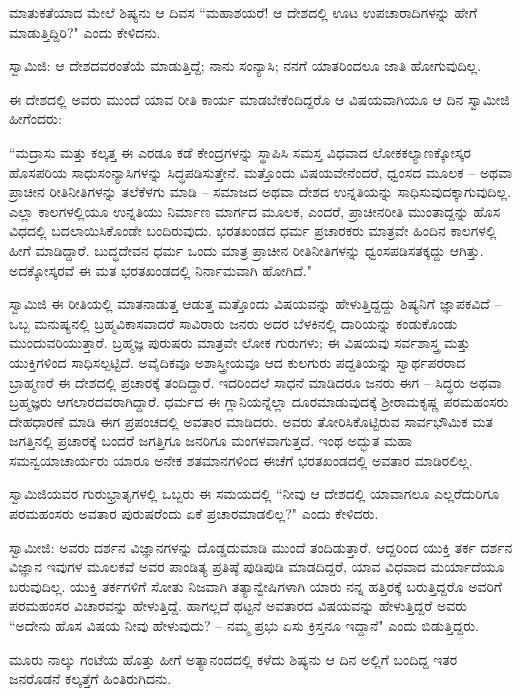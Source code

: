 ಮಾತುಕತೆಯಾದ ಮೇಲೆ ಶಿಷ್ಯನು ಆ ದಿವಸ “ಮಹಾಶಯರೆ! ಆ ದೇಶದಲ್ಲಿ ಊಟ ಉಪಚಾರಾದಿಗಳನ್ನು ಹೇಗೆ ಮಾಡುತ್ತಿದ್ದಿರಿ?" ಎಂದು ಕೇಳಿದನು.

ಸ್ವಾಮಿಜಿ: ಆ ದೇಶದವರಂತೆಯೆ ಮಾಡುತ್ತಿದ್ದೆ; ನಾನು ಸಂನ್ಯಾಸಿ; ನನಗೆ ಯಾತರಿಂದಲೂ ಜಾತಿ ಹೋಗುವುದಿಲ್ಲ.

ಈ ದೇಶದಲ್ಲಿ ಅವರು ಮುಂದೆ ಯಾವ ರೀತಿ ಕಾರ್ಯ ಮಾಡಬೇಕೆಂದಿದ್ದರೊ ಆ ವಿಷಯವಾಗಿಯೂ ಆ ದಿನ ಸ್ವಾಮೀಜಿ ಹೀಗೆಂದರು:

“ಮದ್ರಾಸು ಮತ್ತು ಕಲ್ಕತ್ತ ಈ ಎರಡೂ ಕಡೆ ಕೇಂದ್ರಗಳನ್ನು ಸ್ಥಾಪಿಸಿ ಸಮಸ್ತ ವಿಧವಾದ ಲೋಕಕಲ್ಯಾಣಕ್ಕೋಸ್ಕರ ಹೊಸಪರಿಯ ಸಾಧುಸಂನ್ಯಾಸಿಗಳನ್ನು ಸಿದ್ಧಪಡಿಸುತ್ತೇನೆ. ಮತ್ತೊಂದು ವಿಷಯವೇನೆಂದರೆ, ಧ್ವಂಸದ ಮೂಲಕ – ಅಥವಾ ಪ್ರಾಚೀನ ರೀತಿನೀತಿಗಳನ್ನು ತಲೆಕೆಳಗು ಮಾಡಿ – ಸಮಾಜದ ಅಥವಾ ದೇಶದ ಉನ್ನತಿಯನ್ನು ಸಾಧಿಸುವುದಕ್ಕಾಗುವುದಿಲ್ಲ. ಎಲ್ಲಾ ಕಾಲಗಳಲ್ಲಿಯೂ ಉನ್ನತಿಯು ನಿರ್ಮಾಣ ಮಾರ್ಗದ ಮೂಲಕ, ಎಂದರೆ, ಪ್ರಾಚೀನರೀತಿ ಮುಂತಾದ್ದನ್ನು ಹೊಸ ವಿಧದಲ್ಲಿ ಬದಲಾಯಿಸಿಕೊಂಡೇ ಬಂದಿರುವುದು. ಭರತಖಂಡದ ಧರ್ಮ ಪ್ರಚಾರಕರು ಮಾತ್ರವೇ ಹಿಂದಿನ ಕಾಲಗಳಲ್ಲಿ ಹೀಗೆ ಮಾಡಿದ್ದಾರೆ. ಬುದ್ಧದೇವನ ಧರ್ಮ ಒಂದು ಮಾತ್ರ ಪ್ರಾಚೀನ ರೀತಿನೀತಿಗಳನ್ನು ಧ್ವಂಸಪಡಿಸತಕ್ಕದ್ದು ಆಗಿತ್ತು. ಅದಕ್ಕೋಸ್ಕರವೆ ಈ ಮತ ಭರತಖಂಡದಲ್ಲಿ ನಿರ್ನಾಮವಾಗಿ ಹೋಗಿದೆ."

ಸ್ವಾಮಿಜಿ ಈ ರೀತಿಯಲ್ಲಿ ಮಾತನಾಡುತ್ತ ಆಡುತ್ತ ಮತ್ತೊಂದು ವಿಷಯವನ್ನು ಹೇಳುತ್ತಿದ್ದದ್ದು ಶಿಷ್ಯನಿಗೆ ಜ್ಞಾಪಕವಿದೆ – ಒಬ್ಬ ಮನುಷ್ಯನಲ್ಲಿ ಬ್ರಹ್ಮವಿಕಾಸವಾದರೆ ಸಾವಿರಾರು ಜನರು ಅದರ ಬೆಳಕಿನಲ್ಲಿ ದಾರಿಯನ್ನು ಕಂಡುಕೊಂಡು ಮುಂದುವರಿಯುತ್ತಾರೆ. ಬ್ರಹ್ಮಜ್ಞ ಪುರುಷರು ಮಾತ್ರವೇ ಲೋಕ ಗುರುಗಳು; ಈ ವಿಷಯವು ಸರ್ವಶಾಸ್ತ್ರ ಮತ್ತು ಯುಕ್ತಿಗಳಿಂದ ಸಾಧಿಸಲ್ಪಟ್ಟಿದೆ. ಅವೈದಿಕವೂ ಅಶಾಸ್ತ್ರೀಯವೂ ಆದ ಕುಲಗುರು ಪದ್ದತಿಯನ್ನು ಸ್ವಾರ್ಥಪರರಾದ ಬ್ರಾಹ್ಮಣರೆ ಈ ದೇಶದಲ್ಲಿ ಪ್ರಚಾರಕ್ಕೆ ತಂದಿದ್ದಾರೆ. ಇದರಿಂದಲೆ ಸಾಧನೆ ಮಾಡಿದರೂ ಜನರು ಈಗ – ಸಿದ್ಧರು ಅಥವಾ ಬ್ರಹ್ಮಜ್ಞರು ಆಗಲಾರದವರಾಗಿದ್ದಾರೆ. ಧರ್ಮದ ಈ ಗ್ಲಾನಿಯನ್ನೆಲ್ಲಾ ದೂರಮಾಡುವುದಕ್ಕೆ ಶ‍್ರೀರಾಮಕೃಷ್ಣ ಪರಮಹಂಸರು ದೇಹಧಾರಣೆ ಮಾಡಿ ಈಗ ಪ್ರಪಂಚದಲ್ಲಿ ಅವತಾರ ಮಾಡಿದರು. ಅವರು ತೋರಿಸಿಕೊಟ್ಟಿರುವ ಸಾರ್ವಭೌಮಿಕ ಮತ ಜಗತ್ತಿನಲ್ಲಿ ಪ್ರಚಾರಕ್ಕೆ ಬಂದರೆ ಜಗತ್ತಿಗೂ ಜನರಿಗೂ ಮಂಗಳವಾಗುತ್ತದೆ. ಇಂಥ ಅದ್ಭುತ ಮಹಾ ಸಮನ್ವಯಾಚಾರ್ಯರು ಯಾರೂ ಅನೇಕ ಶತಮಾನಗಳಿಂದ ಈಚೆಗೆ ಭರತಖಂಡದಲ್ಲಿ ಅವತಾರ ಮಾಡಿರಲಿಲ್ಲ.

ಸ್ವಾಮಿಜಿಯವರ ಗುರುಭ್ರಾತೃಗಳಲ್ಲಿ ಒಬ್ಬರು ಈ ಸಮಯದಲ್ಲಿ “ನೀವು ಆ ದೇಶದಲ್ಲಿ ಯಾವಾಗಲೂ ಎಲ್ಲರೆದುರಿಗೂ ಪರಮಹಂಸರು ಅವತಾರ ಪುರುಷರೆಂದು ಏಕೆ ಪ್ರಚಾರಮಾಡಲಿಲ್ಲ?" ಎಂದು ಕೇಳಿದರು.

ಸ್ವಾಮೀಜಿ: ಅವರು ದರ್ಶನ ವಿಜ್ಞಾನಗಳನ್ನು ದೊಡ್ಡದುಮಾಡಿ ಮುಂದೆ ತಂದಿಡುತ್ತಾರೆ. ಆದ್ದರಿಂದ ಯುಕ್ತಿ ತರ್ಕ ದರ್ಶನ ವಿಜ್ಞಾನ ಇವುಗಳ ಮೂಲಕವೆ ಅವರ ಪಾಂಡಿತ್ಯ ಪ್ರತಿಷ್ಠೆ ಪುಡಿಪುಡಿ ಮಾಡದಿದ್ದರೆ, ಯಾವ ವಿಧವಾದ ಮರ್ಯಾದೆಯೂ ಬರುವುದಿಲ್ಲ. ಯುಕ್ತಿ ತರ್ಕಗಳಿಗೆ ಸೋತು ನಿಜವಾಗಿ ತತ್ಯಾನ್ವೇಷಿಗಳಾಗಿ ಯಾರು ನನ್ನ ಹತ್ತಿರಕ್ಕೆ ಬರುತ್ತಿದ್ದರೊ ಅವರಿಗೆ ಪರಮಹಂಸರ ವಿಚಾರವನ್ನು ಹೇಳುತ್ತಿದ್ದೆ. ಹಾಗಲ್ಲದೆ ಥಟ್ಟನೆ ಅವತಾರದ ವಿಷಯವನ್ನು ಹೇಳುತ್ತಿದ್ದರೆ ಅವರು “ಅದೇನು ಹೊಸ ವಿಷಯ ನೀವು ಹೇಳುವುದು? – ನಮ್ಮ ಪ್ರಭು ಏಸು ಕ್ರಿಸ್ತನೂ ಇದ್ದಾನೆ" ಎಂದು ಬಿಡುತ್ತಿದ್ದರು.

ಮೂರು ನಾಲ್ಕು ಗಂಟೆಯ ಹೊತ್ತು ಹೀಗೆ ಅತ್ಯಾನಂದದಲ್ಲಿ ಕಳೆದು ಶಿಷ್ಯನು ಆ ದಿನ ಅಲ್ಲಿಗೆ ಬಂದಿದ್ದ ಇತರ ಜನರೊಡನೆ ಕಲ್ಕತ್ತೆಗೆ ಹಿಂತಿರುಗಿದನು.

